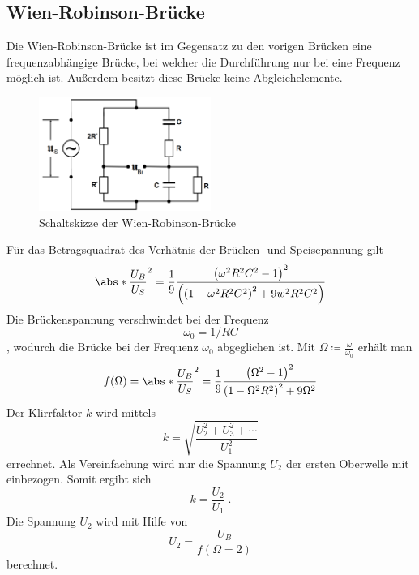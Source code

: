 \subsection{Wien-Robinson-Brücke}
Die Wien-Robinson-Brücke ist im Gegensatz zu den vorigen Brücken eine frequenzabhängige Brücke, bei welcher die Durchführung nur bei eine Frequenz möglich ist.
Außerdem besitzt diese Brücke keine Abgleichelemente.
\begin{figure}
    \centering
    \caption{Schaltskizze der Wien-Robinson-Brücke}
    \label{fig:WR}
    \includegraphics[width=0.5\textwidth]{bridges/WR.png}
\end{figure}
Für das Betragsquadrat des Verhätnis der Brücken- und Speisepannung gilt
\begin{equation}
    \abs*{\frac{U_B}{U_S}}^2 = \frac{1}{9} \frac{\left(\omega^2 R^2 C^2 -1 \right)^2}{\left( \left( 1 - \omega^2 R^2 C^2 \right)^2 
    + 9 w^2 R^2 C^2 \right)} \label{eqn:ratioUBUS}
\end{equation}
Die Brückenspannung verschwindet bei der Frequenz 
\begin{equation}
    \omega_0 = 1/RC \label{eqn:omega0}
\end{equation}
, wodurch die Brücke bei der Frequenz $\omega_0$ abgeglichen ist.
Mit $\Omega \coloneq \frac{\omega}{\omega_0}$ erhält man 
\begin{equation}
    f(\Omega) = \abs*{\frac{U_B}{U_S}}^2 = \frac{1}{9} \frac{\left(\Omega^2 -1 \right)^2}{ \left( 1 - \Omega^2 R^2 \right)^2 
    + 9 \Omega^2} \label{eqn:fOmega}
\end{equation}
Der Klirrfaktor $k$ wird mittels
\begin{equation}
    k = \sqrt{\frac{U_2^2 + U_3^2 + \dotsb }{U_1^2}} \label{eqn:klirrwhole}
\end{equation}
errechnet. Als Vereinfachung wird nur die Spannung $U_2$ der ersten Oberwelle mit einbezogen. Somit ergibt sich
\begin{equation}
    k = \frac{U_2}{U_1} \; \text{.} \label{eqn:klirreasy}
\end{equation} 
Die Spannung $U_2$ wird mit Hilfe von 
\begin{equation}
    U_2 = \frac{U_B}{f(\Omega = 2)} \label{eqn:U2}
\end{equation}
berechnet.